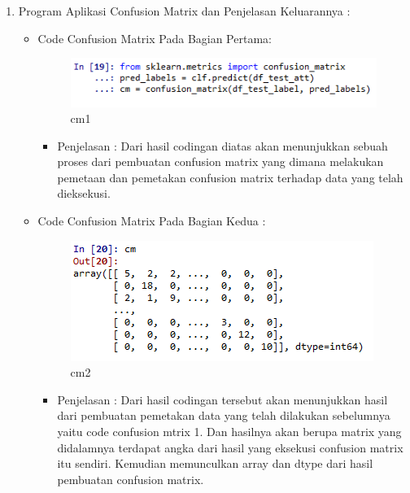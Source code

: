 \begin{enumerate}
\par
\par
\item Program Aplikasi Confusion Matrix dan Penjelasan Keluarannya :
\begin{itemize}
\item Code Confusion Matrix Pada Bagian Pertama:
\par
\begin{figure}[ht]
\centering
\includegraphics[scale=0.4]{figures/Cm1.png}
\caption{cm1}
\label{contoh}
\end{figure}
\par
\begin{itemize}
\item Penjelasan : Dari hasil codingan diatas akan menunjukkan sebuah proses dari pembuatan confusion matrix yang dimana melakukan pemetaan dan pemetakan confusion matrix terhadap data yang telah dieksekusi.
\par 
\par
\end{itemize}
\item Code Confusion Matrix Pada Bagian Kedua :
\par
\begin{figure}[ht]
\centering
\includegraphics[scale=0.2]{figures/cm2.png}
\caption{cm2}
\label{contoh}
\end{figure}
\par
\begin{itemize}
\item Penjelasan : Dari hasil codingan tersebut akan menunjukkan hasil dari pembuatan pemetakan data yang telah dilakukan sebelumnya yaitu code confusion mtrix 1. Dan hasilnya akan  berupa matrix yang didalamnya terdapat angka dari hasil yang eksekusi confusion matrix itu sendiri. Kemudian memunculkan array dan dtype dari hasil pembuatan confusion matrix.
\par

\end{itemize}
\end{itemize}
\end{enumerate}
